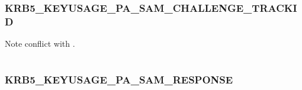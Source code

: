 \documentclass[letterpaper,10pt,english]{sphinxmanual}
\begin{document}
\begin{tabulary}{\linewidth}{|L|L|}
\hline

 & 
\\
\hline\end{tabulary}



\subsubsection{KRB5\_KEYUSAGE\_PA\_SAM\_CHALLENGE\_TRACKID}
\label{appdev/refs/macros/KRB5_KEYUSAGE_PA_SAM_CHALLENGE_TRACKID:krb5-keyusage-pa-sam-challenge-trackid}\label{appdev/refs/macros/KRB5_KEYUSAGE_PA_SAM_CHALLENGE_TRACKID:krb5-keyusage-pa-sam-challenge-trackid-data}\label{appdev/refs/macros/KRB5_KEYUSAGE_PA_SAM_CHALLENGE_TRACKID::doc}

\begin{fulllineitems}
\label{appdev/refs/macros/KRB5_KEYUSAGE_PA_SAM_CHALLENGE_TRACKID:KRB5_KEYUSAGE_PA_SAM_CHALLENGE_TRACKID}
\end{fulllineitems}


Note conflict with  .

\begin{tabulary}{\linewidth}{|L|L|}
\hline

 & 
\\
\hline\end{tabulary}



\subsubsection{KRB5\_KEYUSAGE\_PA\_SAM\_RESPONSE}
\label{appdev/refs/macros/KRB5_KEYUSAGE_PA_SAM_RESPONSE:krb5-keyusage-pa-sam-response-data}\label{appdev/refs/macros/KRB5_KEYUSAGE_PA_SAM_RESPONSE:krb5-keyusage-pa-sam-response}\label{appdev/refs/macros/KRB5_KEYUSAGE_PA_SAM_RESPONSE::doc}

\begin{fulllineitems}
\label{appdev/refs/macros/KRB5_KEYUSAGE_PA_SAM_RESPONSE:KRB5_KEYUSAGE_PA_SAM_RESPONSE}
\end{fulllineitems}
\end{document}
